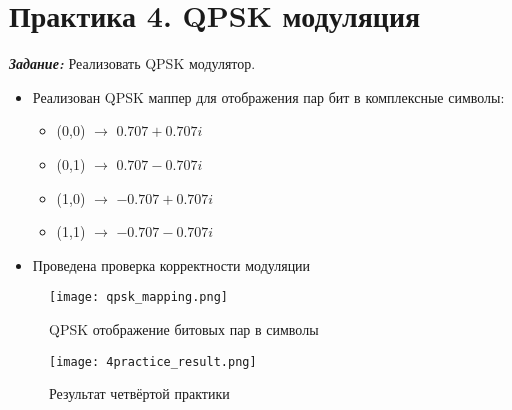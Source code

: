 \chapter*{Практика 4. QPSK модуляция}
\label{ch:4_practice}

\textit{\textbf{Задание:}} Реализовать QPSK модулятор.

\begin{itemize}
    \item Реализован QPSK маппер для отображения пар бит в комплексные символы:
    \begin{itemize}
        \item (0,0) $\rightarrow$ $0.707 + 0.707i$
        \item (0,1) $\rightarrow$ $0.707 - 0.707i$
        \item (1,0) $\rightarrow$ $-0.707 + 0.707i$
        \item (1,1) $\rightarrow$ $-0.707 - 0.707i$
    \end{itemize}
    \item Проведена проверка корректности модуляции
\end{itemize}

\begin{figure}[ht]
    \centering
    \texttt{[image: qpsk\_mapping.png]}
    \caption{QPSK отображение битовых пар в символы}
    \label{fig:qpsk_mapping}
\end{figure}

\begin{figure}[ht]
    \centering
    \texttt{[image: 4practice\_result.png]}
    \caption{Результат четвёртой практики}
    \label{fig:4practice_result}
\end{figure}